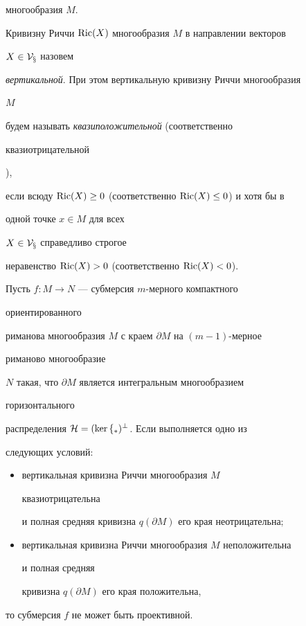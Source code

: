 многообразия $M$. 


 


Кривизну Риччи $\operatorname{Ric}(X)$ многообразия $M$ в направлении векторов 


$X\in\cal V_x$ назовем 


{\it вертикальной}. При этом вертикальную кривизну Риччи многообразия 


$M$ 


будем называть {\it квазиположительной} (соответственно {\it 


квазиотрицательной}), 


если всюду $\operatorname{Ric}(X)\ge 0$ (соответственно $\operatorname{Ric}(X)\le 0$) и хотя бы в 


одной точке $x\in M$ для всех 


$X\in\cal V_x$ справедливо строгое 


неравенство $\operatorname{Ric}(X)>0$ (соответственно $\operatorname{Ric}(X)<0$). 


 


\begin{thm} Пусть $f:M\to N$ --- субмерсия $m$-мерного компактного 


ориентированного 


риманова многообразия $M$ с краем $\partial M$ на $(m-1)$-мерное 


риманово многообразие 


$N$ такая, что $\partial M$ является интегральным многообразием 


горизонтального 


распределения $\cal H=(\ker f_*)^\bot$. Если выполняется одно из 


следующих условий$:$ 


\begin{itemize} 


\item[(1)] вертикальная кривизна Риччи многообразия $M$ 


квазиотрицательна 


и полная средняя кривизна $q(\partial M)$ его края неотрицательна$;$ 


\item[(2)] вертикальная кривизна Риччи многообразия $M$ неположительна 


и полная средняя 


кривизна $q(\partial M)$ его края положительна, 


\end{itemize} 


то субмерсия $f$ не может быть проективной. 


\end{thm} 


